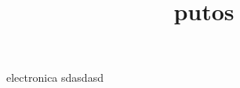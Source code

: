 \documentclass[12pt]{article}
\title{putos}
\author{}
\begin{document}
\maketitle
    electronica sdasdasd
\end{document}
